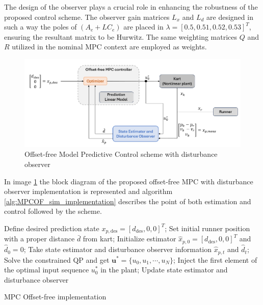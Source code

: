 \documentclass[a4paper,12pt,oneside]{book}
\begin{document}
\bigskip
The design of the observer plays a crucial role in enhancing the robustness of the proposed control scheme.
The observer gain matrices $L_x$ and $L_d$ are designed in such a way the poles of $(A_e + L C_e)$ are placed in $\lambda=[0.5, 0.51, 0.52, 0.53]^T$, ensuring the resultant matrix to be Hurwitz. 
The same weighting matrices $Q$ and $R$ utilized in the nominal MPC context are employed as weights.

\begin{figure}
	\centering
	\includegraphics[width=1.0\textwidth]{MPC_of_scheme.png}
	\caption{Offset-free Model Predictive Control scheme with disturbance observer}
	\label{image:mpc_of_scheme}
\end{figure}

In image \ref{image:mpc_of_scheme} the block diagram of the proposed offset-free MPC with disturbance observer implementation is represented and algorithm \ref{alg:MPCOF_sim_implementation} describes the point of both estimation and control followed by the scheme.

\begin{algorithm}
\begin{algorithmic}[1]
	\State Define desired prediction state $x_{p,\text{des}} = [d_{\text{des}}, 0, 0]^T$;
	\State Set initial runner position with a proper distance $\bar{d}$ from kart;
	\State Initialize estimator $\hat{x}_{p,0} = [d_{\text{des}}, 0, 0]^T$ and $\hat{d}_0 = 0$;
		\State Take state estimator and disturbance observer information $\hat{x}_{p,t}$ and $\hat{d}_t$;
		\State Solve the constrained QP and get $\boldsymbol{u}^* = \{u_0, u_1, \cdots, u_N\}$; 
		\State Inject the first element of the optimal input sequence $u_0^*$ in the plant;
		\State Update state estimator and disturbance observer 
	\EndFor
\caption{MPC Offset-free implementation}
\label{alg:MPCOF_sim_implementation}
\end{algorithmic}
\end{algorithm}
\end{document}
